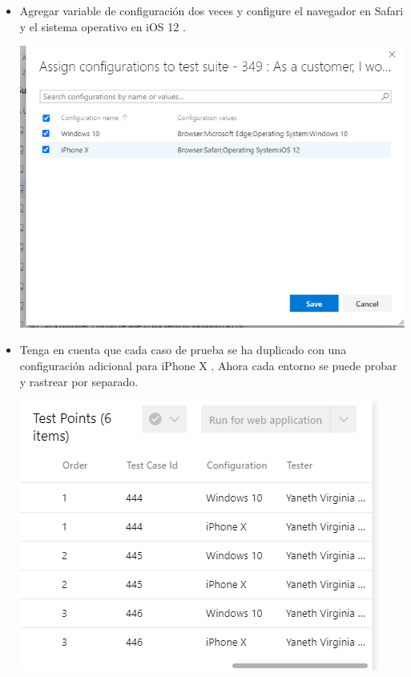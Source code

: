 \begin{itemize}
\begin{center}
\end{center}
\item Agregar variable de configuración dos veces y configure el navegador en Safari y el sistema operativo en iOS 12 .
\begin{center}
\includegraphics[width=\columnwidth]{images/14}\newline
\end{center} 
\item Tenga en cuenta que cada caso de prueba se ha duplicado con una configuración adicional para iPhone X . Ahora cada entorno se puede probar y rastrear por separado.
\begin{center}
\includegraphics[width=\columnwidth]{images/15}\newline
\end{center} 
\end{itemize}

